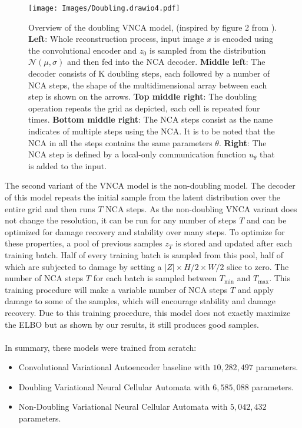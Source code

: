 \begin{figure}[ht]
    \centering
    \texttt{[image: Images/Doubling.drawio4.pdf]}
    \caption{Overview of the doubling VNCA model, (inspired by figure 2 from \cite{palm2022variational}). \textbf{Left}: Whole reconstruction process, input image $x$ is encoded using the convolutional encoder and $z_0$ is sampled from the distribution $\mathcal{N}(\mu, \sigma)$ and then fed into the NCA decoder. \textbf{Middle left}: The decoder consists of K doubling steps, each followed by a number of NCA steps, the shape of the multidimensional array between each step is shown on the arrows. \textbf{Top middle right}: The doubling operation repeats the grid as depicted, each cell is repeated four times. \textbf{Bottom middle right}: The NCA steps consist as the name indicates of multiple steps using the NCA. It is to be noted that the NCA in all the steps contains the same parameters $\theta$. \textbf{Right}: The NCA step is defined by a local-only communication function $u_\theta$ that is added to the input.}
    \label{fig:DoublingVNCAOverview}
\end{figure}

The second variant of the VNCA model is the non-doubling model. The decoder of this model repeats the initial sample from the latent distribution over the entire grid and then runs $T$ NCA steps. As the non-doubling VNCA variant does not change the resolution, it can be run for any number of steps $T$ and can be optimized for damage recovery and stability over many steps. To optimize for these properties, a pool of previous samples $z_T$ is stored and updated after each training batch. Half of every training batch is sampled from this pool, half of which are subjected to damage by setting a $|Z| \times H / 2 \times W / 2$ slice to zero. The number of NCA steps $T$ for each batch is sampled between $T_\text{min}$ and $T_\text{max}$. This training procedure will make a variable number of NCA steps $T$ and apply damage to some of the samples, which will encourage stability and damage recovery. Due to this training procedure, this model does not exactly maximize the ELBO but as shown by our results, it still produces good samples.\\\\
In summary, these models were trained from scratch:

\begin{itemize}
    \item Convolutional Variational Autoencoder baseline with $10,282,497$ parameters.
    \item Doubling Variational Neural Cellular Automata with $6,585,088$ parameters.
    \item Non-Doubling Variational Neural Cellular Automata with $5,042,432$ parameters.
\end{itemize}

